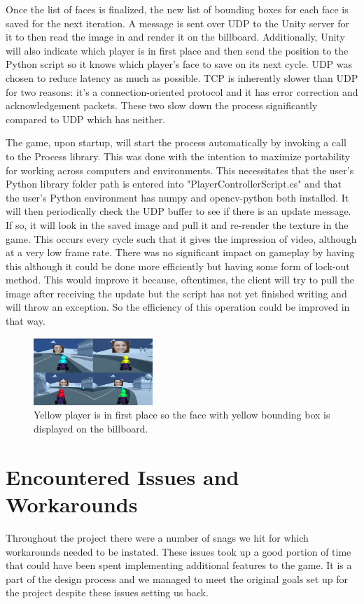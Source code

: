 \documentclass[a4paper,10pt]{article}
\begin{document}
Once the list of faces is finalized, the new list of bounding boxes for each face is saved for the next iteration. A message is sent over UDP to the Unity server for it to then read the image in and render it on the billboard. Additionally, Unity will also indicate which player is in first place and then send the position to the Python script so it knows which player's face to save on its next cycle. UDP was chosen to reduce latency as much as possible. TCP is inherently slower than UDP for two reasons: it's a connection-oriented protocol and it has error correction and acknowledgement packets. These two slow down the process significantly compared to UDP which has neither. 


The game, upon startup, will start the process automatically by invoking a call to the Process library. This was done with the intention to maximize portability for working across computers and environments. This necessitates that the user's Python library folder path is entered into "PlayerControllerScript.cs" and that the user's Python environment has numpy and opencv-python both installed. It will then periodically check the UDP buffer to see if there is an update message. If so, it will look in the saved image and pull it and re-render the texture in the game. This occurs every cycle such that it gives the impression of video, although at a very low frame rate. There was no significant impact on gameplay by having this although it could be done more efficiently but having some form of lock-out method. This would improve it because, oftentimes, the client will try to pull the image after receiving the update but the script has not yet finished writing and will throw an exception. So the efficiency of this operation could be improved in that way.

\begin{figure}[H]
  \centering
      \includegraphics[width=0.4\textwidth]{Assets/Face.png}
  \caption{Yellow player is in first place so the face with yellow bounding box is displayed on the billboard.}
\end{figure}

\section{Encountered Issues and Workarounds}
Throughout the project there were a number of snags we hit for which workarounds needed to be instated. These issues took up a good portion of time that could have been spent implementing additional features to the game. It is a part of the design process and we managed to meet the original goals set up for the project despite these issues setting us back.
\end{document}
